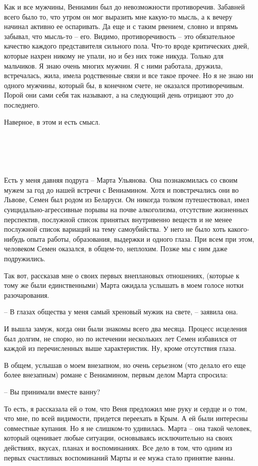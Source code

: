 \documentclass[
]{book}
\begin{document}
Как и все мужчины, Вениамин был до невозможности противоречив. Забавней всего было то, что утром он мог выразить мне какую-то мысль, а к вечеру начинал активно ее оспаривать. Да еще и с таким рвением, словно и впрямь забывал, что мысль-то -- его. Видимо, противоречивость -- это обязательное качество каждого представителя сильного пола. Что-то вроде критических дней, которые нахрен никому не упали, но и без них тоже никуда. Только для мальчиков. Я знаю очень многих мужчин. Я с ними работала, дружила, встречалась, жила, имела родственные связи и все такое прочее. Но я не знаю ни одного мужчины, который бы, в конечном счете, не оказался противоречивым. Порой они сами себя так называют, а на следующий день отрицают это до последнего.

Наверное, в этом и есть смысл.

\hypertarget{chapter-18}{%
\chapter{~}\label{chapter-18}}

Есть у меня давняя подруга -- Марта Ульянова. Она познакомилась со своим мужем за год до нашей встречи с Вениамином. Хотя и повстречались они во Львове, Семен был родом из Беларуси. Он никогда толком путешествовал, имел суицидально-агрессивные порывы на почве алкоголизма, отсутствие жизненных перспектив, послужной список принятых внутривенно веществ и не менее послужной список вариаций на тему самоубийства. У него не было хоть какого-нибудь опыта работы, образования, выдержки и одного глаза. При всем при этом, человеком Семен оказался, в общем-то, неплохим. Позже мы с ним даже подружились.

Так вот, рассказав мне о своих первых внеплановых отношениях, (которые к тому же были единственными) Марта ожидала услышать в моем голосе нотки разочарования.

-- В глазах общества у меня самый хреновый мужик на свете, -- заявила она.

И вышла замуж, когда они были знакомы всего два месяца. Процесс исцеления был долгим, не спорю, но по истечении нескольких лет Семен избавился от каждой из перечисленных выше характеристик. Ну, кроме отсутствия глаза.

В общем, услышав о моем внезапном, но очень серьезном (что делало его еще более внезапным) романе с Вениамином, первым делом Марта спросила:

-- Вы принимали вместе ванну?

То есть, я рассказала ей о том, что Веня предложил мне руку и сердце и о том, что мне, по всей видимости, придется переехать в Крым. А ей были интересны совместные купания. Но я не слишком-то удивилась. Марта -- она такой человек, который оценивает любые ситуации, основываясь исключительно на своих действиях, вкусах, планах и воспоминаниях. Все дело в том, что одним из первых счастливых воспоминаний Марты и ее мужа стало принятие ванны.
\end{document}
